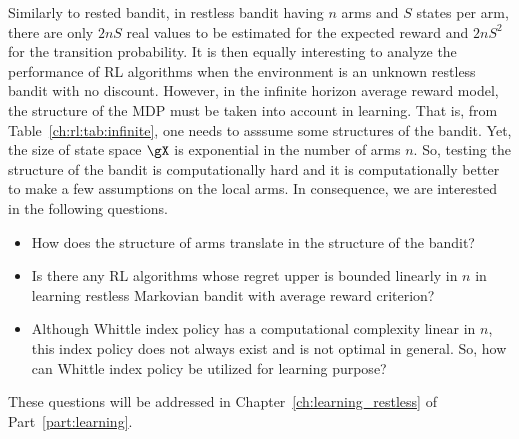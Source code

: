 Similarly to rested bandit, in restless bandit having $n$ arms and $S$ states per arm, there are only $2nS$ real values to be estimated for the expected reward and $2nS^2$ for the transition probability.
It is then equally interesting to analyze the performance of RL algorithms when the environment is an unknown restless bandit with no discount.
However, in the infinite horizon average reward model, the structure of the MDP must be taken into account in learning.
That is, from Table~\ref{ch:rl:tab:infinite}, one needs to asssume some structures of the bandit.
Yet, the size of state space $\gX$ is exponential in the number of arms $n$.
So, testing the structure of the bandit is computationally hard and it is computationally better to make a few assumptions on the local arms.
In consequence, we are interested in the following questions.
\begin{itemize}
    \item How does the structure of arms translate in the structure of the bandit?
    \item Is there any RL algorithms whose regret upper is bounded linearly in $n$ in learning restless Markovian bandit with average reward criterion?
    \item Although Whittle index policy has a computational complexity linear in $n$, this index policy does not always exist and is not optimal in general. So, how can Whittle index policy be utilized for learning purpose?
\end{itemize}
These questions will be addressed in Chapter~\ref{ch:learning_restless} of Part~\ref{part:learning}.

\endgroup
